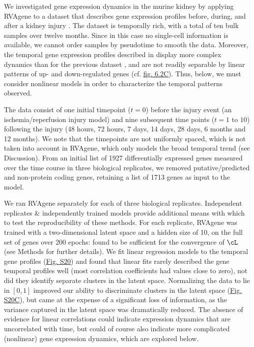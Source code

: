 We investigated gene expression dynamics in the murine kidney by applying RVAgene to a dataset that
describes gene expression profiles before, during, and after a kidney injury
\citep{liu2017molecular}. The dataset is temporally rich, with a total of ten bulk samples over
twelve months. Since in this case no single-cell information is available, we cannot order samples
by pseudotime to smooth the data. Moreover, the temporal gene expression profiles described in
\citet{liu2017molecular} display more complex dynamics than for the previous dataset
\citep{Klein2015}, and are not readily separable by linear patterns of up- and down-regulated genes
(cf. \hyperref[fig:fig3]{fig. 6.2C}). Thus, below, we must consider nonlinear models in order to characterize the temporal patterns observed.
\par 
The data consist of one initial timepoint ($t = 0$) before the injury event (an ischemia/reperfusion injury model) and nine subsequent time points ($t = 1$ to $10$) following the injury (48 hours, 72 hours, 7 days, 14 days, 28 days, 6 months and 12 months). We note that the timepoints are not uniformly spaced, which is not taken into account in RVAgene, which only models the broad temporal trend (see Discussion). From an initial list of 1927 differentially expressed genes measured over the time course in three biological replicates, we removed putative/predicted and non-protein coding genes, retaining a list of 1713 genes as input to the model.
\par 
We ran RVAgene separately for each of three biological replicates. Independent replicates \& independently trained models provide additional means with which to test the reproducibility of these methods. For each replicate, RVAgene was trained with a two-dimensional latent space and a hidden size of 10, on the full set of genes over 200 epochs: found to be sufficient for the convergence of $\cL$ (see Methods for further details). We fit linear regression models to the temporal gene profiles (\hyperref[fig:figS5]{Fig. S20}) and found that linear fits rarely described the gene temporal profiles well (most correlation coefficients had values close to zero), not did they identify separate clusters in the latent space. Normalizing the data to lie in $[0,1]$ improved our ability to discriminate clusters in the latent space (\hyperref[fig:figS5]{Fig. S20C}), but came at the expense of a significant loss of information, as the variance captured in the latent space was dramatically reduced. The absence of evidence for linear correlations could indicate expression dynamics that are uncorrelated with time, but could of course also indicate more complicated (nonlinear) gene expression dynamics, which are explored below. 

